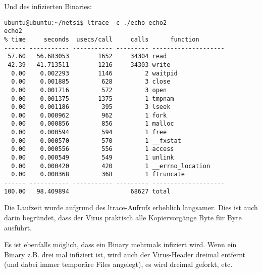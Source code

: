 \documentclass[a4paper,11pt,parskip=half]{scrartcl}
\begin{document}
Und des infizierten Binaries:
\begin{lstlisting}
ubuntu@ubuntu:~/netsi$ ltrace -c ./echo echo2
echo2
% time     seconds  usecs/call     calls      function
------ ----------- ----------- --------- --------------------
 57.60   56.683053        1652     34304 read
 42.39   41.713511        1216     34303 write
  0.00    0.002293        1146         2 waitpid
  0.00    0.001885         628         3 close
  0.00    0.001716         572         3 open
  0.00    0.001375        1375         1 tmpnam
  0.00    0.001186         395         3 lseek
  0.00    0.000962         962         1 fork
  0.00    0.000856         856         1 malloc
  0.00    0.000594         594         1 free
  0.00    0.000570         570         1 __fxstat
  0.00    0.000556         556         1 access
  0.00    0.000549         549         1 unlink
  0.00    0.000420         420         1 __errno_location
  0.00    0.000368         368         1 ftruncate
------ ----------- ----------- --------- --------------------
100.00   98.409894                 68627 total
\end{lstlisting}

Die Laufzeit wurde aufgrund des ltrace-Aufrufs erheblich langsamer. Dies ist auch darin begründet, dass der Virus praktisch alle Kopiervorgänge Byte für Byte ausführt.

Es ist ebenfalls möglich, dass ein Binary mehrmals infiziert wird. Wenn ein Binary z.B. drei mal infiziert ist, wird auch der \glqq{}Virus-Header\grqq{} dreimal entfernt (und dabei immer temporäre Files angelegt), es wird dreimal geforkt, etc.
\end{document}
